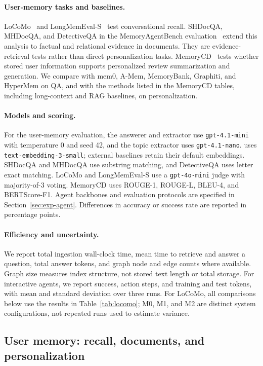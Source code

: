 \paragraph{User-memory tasks and baselines.}
LoCoMo~\citep{locomo} and LongMemEval-S~\citep{longmemeval} test conversational
recall. SHDocQA, MHDocQA, and DetectiveQA in the MemoryAgentBench
evaluation~\citep{memoryagentbench} extend this analysis to factual and
relational evidence in documents. They are evidence-retrieval tests rather
than direct personalization tasks. MemoryCD~\citep{memorycd} tests whether
stored user information supports personalized review summarization and
generation. We compare with mem0, A-Mem, MemoryBank, Graphiti, and HyperMem on
QA, and with the methods listed in the MemoryCD tables, including
long-context and RAG baselines, on personalization.

\paragraph{Models and scoring.}
For the user-memory evaluation, the answerer and extractor use
\texttt{gpt-4.1-mini} with temperature 0 and seed 42, and the topic extractor
uses \texttt{gpt-4.1-nano}. \ours uses \texttt{text-embedding-3-small}; external
baselines retain their default embeddings. SHDocQA and MHDocQA use substring
matching, and DetectiveQA uses letter exact matching. LoCoMo and LongMemEval-S
use a \texttt{gpt-4o-mini} judge with majority-of-3 voting. MemoryCD uses
ROUGE-1, ROUGE-L, BLEU-4, and BERTScore-F1. Agent backbones and evaluation
protocols are specified in Section~\ref{sec:exp-agent}. Differences in accuracy
or success rate are reported in percentage points.

\paragraph{Efficiency and uncertainty.}
We report total ingestion wall-clock time, mean time to retrieve and answer a
question, total answer tokens, and graph node and edge counts where available.
Graph size measures index structure, not stored text length or total storage.
For interactive agents, we report success, action steps, and training and test
tokens, with mean and standard deviation over three runs. For LoCoMo, all
comparisons below use the results in Table~\ref{tab:locomo}; M0, M1, and M2
are distinct system configurations, not repeated runs used to estimate
variance.

\subsection{User memory: recall, documents, and personalization}
\label{sec:exp-user}

